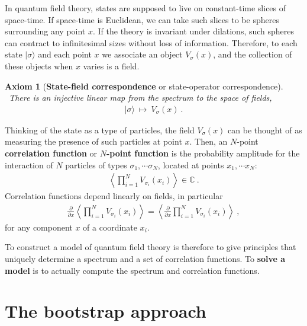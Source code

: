 \documentclass[12pt, a4paper, notitlepage, twoside]{report}
\numberwithin{equation}{section}
\theoremstyle{break}
\newtheorem{hyp}{Axiom}[chapter]
\begin{document}
In quantum field theory, states are supposed to live on constant-time slices of space-time. If space-time is Euclidean, we can take such slices to be spheres surrounding any point $x$. If the theory is invariant under dilations, such spheres can contract to infinitesimal sizes without loss of information. Therefore, to each state $|\sigma\rangle$ and each point $x$ we associate an object $V_\sigma(x)$, and the collection of these objects when $x$ varies is a field. 

\begin{hyp}[\textbf{\boldmath State-field correspondence} or state-operator correspondence]
~\label{ax:sfc}
 There is an injective linear map from the spectrum to the space of fields,
 \begin{align}
 |\sigma \rangle  \ \mapsto \ V_\sigma(x)\ .
\end{align}
\end{hyp} 
\noindent
Thinking of the state as a type of particles, the field $V_\sigma(x)$ can be thought of as measuring the presence of such particles at point $x$.
Then, an $N$-point \textbf{\boldmath correlation function} or \textbf{\boldmath $N$-point function} is the probability amplitude for the interaction of $N$ particles of types $\sigma_1,\cdots \sigma_N$, located at points $x_1,\cdots x_N$:
\begin{align}
\left\langle \prod_{i=1}^N V_{\sigma_i}(x_i)\right\rangle\in \mathbb{C}\ .
\label{pva}
\end{align}
Correlation functions depend linearly on fields, in particular 
\begin{align}
 \frac{\partial}{\partial x} \left\langle \prod_{i=1}^N V_{\sigma_i}(x_i)\right\rangle = \left\langle \frac{\partial}{\partial x} \prod_{i=1}^N V_{\sigma_i}(x_i)\right\rangle\ ,
\end{align}
for any component $x$ of a coordinate $x_i$. 

To construct a model of quantum field theory is therefore to give principles that uniquely determine a spectrum and a set of correlation functions.
To \textbf{\boldmath solve a model} is to actually compute the spectrum and correlation functions. 

\section{The bootstrap approach}
\end{document}
